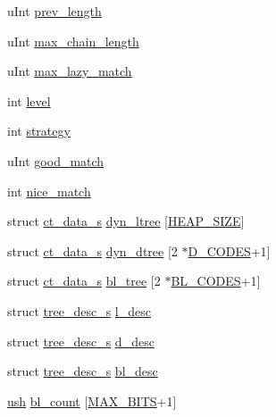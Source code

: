 \begin{DoxyCompactItemize}
\item 
u\+Int \hyperlink{structinternal__state_a7619fb70f9f66ff21b419b8ceac4904c}{prev\+\_\+length}
\item 
u\+Int \hyperlink{structinternal__state_ab1ffa7feb159edec170574813fae3279}{max\+\_\+chain\+\_\+length}
\item 
u\+Int \hyperlink{structinternal__state_ab74215ec1c106bf588a7642927d47b84}{max\+\_\+lazy\+\_\+match}
\item 
int \hyperlink{structinternal__state_a7ad2ab1df80c8cab4ffb97ff84e88c62}{level}
\item 
int \hyperlink{structinternal__state_a67219312df7fd2f86e06e6f14700eb28}{strategy}
\item 
u\+Int \hyperlink{structinternal__state_a68ba00254242017f330dca5e0191bca4}{good\+\_\+match}
\item 
int \hyperlink{structinternal__state_a39ab99e52138c0628f645bc1e0c69a04}{nice\+\_\+match}
\item 
struct \hyperlink{structct__data__s}{ct\+\_\+data\+\_\+s} \hyperlink{structinternal__state_ae11867c05d54c575dbc713bbea71266c}{dyn\+\_\+ltree} \mbox{[}\hyperlink{deflate_8h_a1b45302695680930829cac31d65e41e1}{H\+E\+A\+P\+\_\+\+S\+I\+Z\+E}\mbox{]}
\item 
struct \hyperlink{structct__data__s}{ct\+\_\+data\+\_\+s} \hyperlink{structinternal__state_a42a52476d3cde41e57a6ef2a6a78008f}{dyn\+\_\+dtree} \mbox{[}2 $\ast$\hyperlink{deflate_8h_a8798a9a526623abbd88fedb0727e21aa}{D\+\_\+\+C\+O\+D\+E\+S}+1\mbox{]}
\item 
struct \hyperlink{structct__data__s}{ct\+\_\+data\+\_\+s} \hyperlink{structinternal__state_a98131fc5b64d0d7542bc3621aef19854}{bl\+\_\+tree} \mbox{[}2 $\ast$\hyperlink{deflate_8h_a9e19158a493307d4f211cdf223da8319}{B\+L\+\_\+\+C\+O\+D\+E\+S}+1\mbox{]}
\item 
struct \hyperlink{structtree__desc__s}{tree\+\_\+desc\+\_\+s} \hyperlink{structinternal__state_a0266c4e0250652904e6b4908d8da84a9}{l\+\_\+desc}
\item 
struct \hyperlink{structtree__desc__s}{tree\+\_\+desc\+\_\+s} \hyperlink{structinternal__state_ab2fddb383d3055b6ec81c7fef14e99d8}{d\+\_\+desc}
\item 
struct \hyperlink{structtree__desc__s}{tree\+\_\+desc\+\_\+s} \hyperlink{structinternal__state_aa0e5da102c35a7e7d22dd1894039393b}{bl\+\_\+desc}
\item 
\hyperlink{zutil_8h_a3754180d606d4ed15468d15d9665aa2e}{ush} \hyperlink{structinternal__state_abf9e786c8e5b4ab5d620ab123208034c}{bl\+\_\+count} \mbox{[}\hyperlink{deflate_8h_a51c241e7ad52441b8d4c1fd5f498b3b9}{M\+A\+X\+\_\+\+B\+I\+T\+S}+1\mbox{]}

\end{DoxyCompactItemize}
